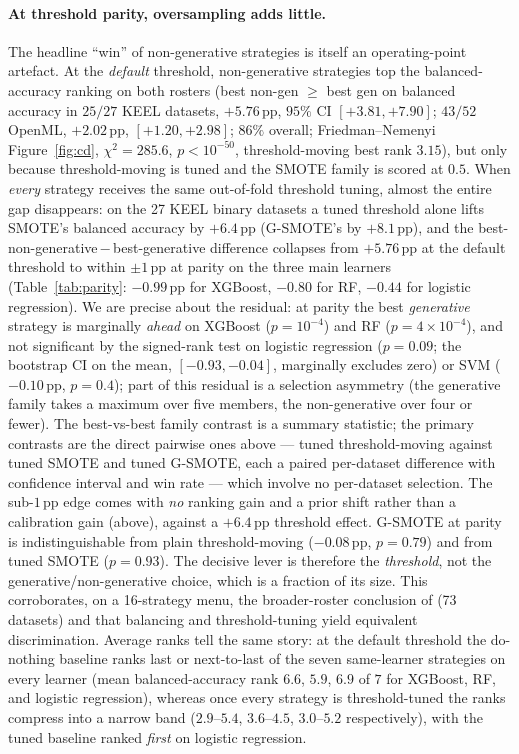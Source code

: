 \paragraph{At threshold parity, oversampling adds little.} The headline ``win''
of non-generative strategies is itself an operating-point artefact. At the
\emph{default} threshold, non-generative strategies top the balanced-accuracy
ranking on both rosters (best non-gen $\ge$ best gen on balanced accuracy in
$25/27$ KEEL datasets, $+5.76$\,pp, $95\%$ CI $[+3.81,+7.90]$; $43/52$ OpenML,
$+2.02$\,pp, $[+1.20,+2.98]$; $86\%$ overall; Friedman--Nemenyi
Figure~\ref{fig:cd}, $\chi^2{=}285.6$, $p<10^{-50}$, threshold-moving best rank
$3.15$), but only because threshold-moving is tuned and the SMOTE family is
scored at $0.5$. When \emph{every} strategy receives the same out-of-fold
threshold tuning, almost the entire gap disappears: on the 27 KEEL binary datasets
a tuned threshold alone lifts SMOTE's balanced accuracy by $+6.4$\,pp (G-SMOTE's
by $+8.1$\,pp), and the
best-non-generative\,$-$\,best-generative difference collapses from $+5.76$\,pp at
the default threshold to within $\pm1$\,pp at parity on the three main learners
(Table~\ref{tab:parity}:
$-0.99$\,pp for XGBoost, $-0.80$ for RF, $-0.44$ for logistic regression). We are
precise about the residual: at parity the best \emph{generative} strategy is
marginally \emph{ahead} on XGBoost ($p{=}10^{-4}$) and RF ($p{=}4\times10^{-4}$),
and not significant by the signed-rank test on logistic regression ($p{=}0.09$;
the bootstrap CI on the mean, $[-0.93,-0.04]$, marginally excludes zero) or SVM
($-0.10$\,pp, $p{=}0.4$); part of this residual is a selection asymmetry (the generative family
takes a maximum over five members, the non-generative over four or fewer). The
best-vs-best family contrast is a summary statistic; the primary contrasts are the
direct pairwise ones above --- tuned threshold-moving against tuned SMOTE and
tuned G-SMOTE, each a paired per-dataset difference with confidence interval and
win rate --- which involve no per-dataset selection. The
sub-$1$\,pp edge comes
with \emph{no} ranking gain and a prior shift rather than a calibration gain
(above), against a
$+6.4$\,pp threshold effect. G-SMOTE at parity is indistinguishable from plain
threshold-moving ($-0.08$\,pp, $p{=}0.79$) and from tuned SMOTE ($p{=}0.93$).
The decisive lever is therefore the \emph{threshold},
not the generative/non-generative choice, which is a fraction of its size. This
corroborates, on a 16-strategy menu, the broader-roster
conclusion of \cite{elor2022smote} (73 datasets) and \cite{goorbergh2022harm} that
balancing and threshold-tuning yield equivalent discrimination. Average ranks
tell the same story: at the default threshold the do-nothing baseline ranks
last or next-to-last of the seven same-learner strategies on every learner
(mean balanced-accuracy rank
$6.6$, $5.9$, $6.9$ of $7$ for XGBoost, RF, and logistic regression), whereas
once every strategy is threshold-tuned the ranks compress into a narrow band
($2.9$--$5.4$, $3.6$--$4.5$, $3.0$--$5.2$ respectively), with the tuned baseline
ranked \emph{first} on logistic regression.

